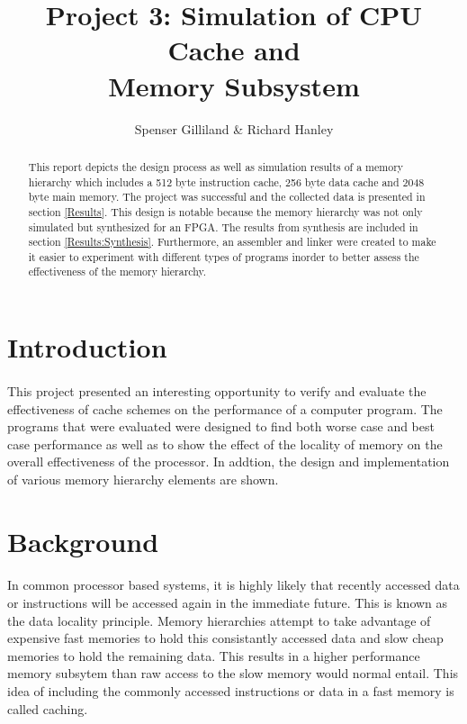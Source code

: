 \documentclass[11pt,letterpaper,]{article}
\author{Spenser Gilliland \& Richard Hanley}
\title{Project 3: Simulation of CPU Cache and \\ Memory Subsystem}
\begin{document}
\maketitle
\bigskip
\bigskip
\bigskip

\doublespacing

\begin{abstract}
This report depicts the design process as well as simulation results of a memory hierarchy which includes a 512 byte instruction cache, 256 byte data cache and 2048 byte main memory.  The project was successful and the collected data is presented in section \ref{Results}.  This design is notable because the memory hierarchy was not only simulated but synthesized for an FPGA.  The results from synthesis are included in section \ref{Results:Synthesis}.  Furthermore, an assembler and linker were created to make it easier to experiment with different types of programs inorder to better assess the effectiveness of the memory hierarchy.
\end{abstract}

\pagebreak
\section{ Introduction }
\paragraph{}
This project presented an interesting opportunity to verify and evaluate the effectiveness of cache schemes on the performance of a computer program.  The programs that were evaluated were designed to find both worse case and best case performance as well as to show the effect of the locality of memory on the overall effectiveness of the processor. In addtion, the design and implementation of various memory hierarchy elements are shown.

\section{ Background }
\paragraph{}
In common processor based systems, it is highly likely that recently accessed data or instructions will be accessed again in the immediate future.  This is known as the data locality principle.  Memory hierarchies attempt to take advantage of expensive fast memories to hold this consistantly accessed data and slow cheap memories to hold the remaining data.  This results in a higher performance memory subsytem than raw access to the slow memory would normal entail.  This idea of including the commonly accessed instructions or data in a fast memory is called caching.
\end{document}
